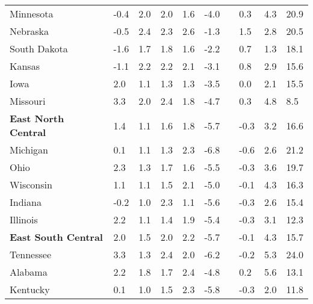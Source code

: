 {\begin{tabular}{p{30mm} R{7mm} R{7mm} R{7mm} R{7mm} 
             R{7mm} p{0mm} R{9mm} R{9mm} R{10mm} }
\hspace{3mm}  Minnesota  & -0.4 & 2.0 & 2.0 & 1.6 & -4.0 &  & 0.3 & 4.3 & 20.9 \\
\hspace{3mm}  Nebraska  & -0.5 & 2.4 & 2.3 & 2.6 & -1.3 &  & 1.5 & 2.8 & 20.5 \\
\hspace{3mm}  South Dakota  & -1.6 & 1.7 & 1.8 & 1.6 & -2.2 &  & 0.7 & 1.3 & 18.1 \\
\hspace{3mm}  Kansas  & -1.1 & 2.2 & 2.2 & 2.1 & -3.1 &  & 0.8 & 2.9 & 15.6 \\
\hspace{3mm}  Iowa  & 2.0 & 1.1 & 1.3 & 1.3 & -3.5 &  & 0.0 & 2.1 & 15.5 \\
\hspace{3mm}  Missouri  & 3.3 & 2.0 & 2.4 & 1.8 & -4.7 &  & 0.3 & 4.8 & 8.5 \\
\hspace{1mm} \textbf{East North Central}  & 1.4 & 1.1 & 1.6 & 1.8 & -5.7 &  & -0.3 & 3.2 & 16.6 \\
\hspace{3mm}  Michigan  & 0.1 & 1.1 & 1.3 & 2.3 & -6.8 &  & -0.6 & 2.6 & 21.2 \\
\hspace{3mm}  Ohio  & 2.3 & 1.3 & 1.7 & 1.6 & -5.5 &  & -0.3 & 3.6 & 19.7 \\
\hspace{3mm}  Wisconsin  & 1.1 & 1.1 & 1.5 & 2.1 & -5.0 &  & -0.1 & 4.3 & 16.3 \\
\hspace{3mm}  Indiana  & -0.2 & 1.0 & 2.3 & 1.1 & -5.6 &  & -0.3 & 2.6 & 15.4 \\
\hspace{3mm}  Illinois  & 2.2 & 1.1 & 1.4 & 1.9 & -5.4 &  & -0.3 & 3.1 & 12.3 \\
\hspace{1mm} \textbf{East South Central}  & 2.0 & 1.5 & 2.0 & 2.2 & -5.7 &  & -0.1 & 4.3 & 15.7 \\
\hspace{3mm}  Tennessee  & 3.3 & 1.3 & 2.4 & 2.0 & -6.2 &  & -0.2 & 5.3 & 24.0 \\
\hspace{3mm}  Alabama  & 2.2 & 1.8 & 1.7 & 2.4 & -4.8 &  & 0.2 & 5.6 & 13.1 \\
\hspace{3mm}  Kentucky  & 0.1 & 1.0 & 1.5 & 2.3 & -5.8 &  & -0.3 & 2.0 & 11.8 \\

\end{tabular}}
